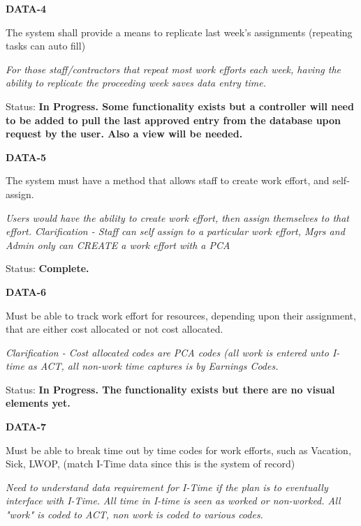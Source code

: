 \noindent 

\noindent \textbf{DATA-4}

\noindent The system shall provide a means to replicate last week's assignments (repeating tasks can auto fill)

\noindent \textit{For those staff/contractors that repeat most work efforts each week, having the ability to replicate the proceeding week saves data entry time.}

\noindent Status: \textbf{In Progress.  Some functionality exists but a controller will need to be added to pull the last approved entry from the database upon request by the user.  Also a view will be needed.}\textit{}\\

\noindent 

\noindent \textbf{DATA-5}

\noindent The system must have a method that allows staff to create work effort, and self-assign.

\noindent \textit{Users would have the ability to create work effort, then assign themselves to that effort. Clarification - Staff can self assign to a particular work effort, Mgrs and Admin only can CREATE a work effort with a PCA}

Status: \textbf{Complete.}\textit{}\\

\noindent 

\noindent \textbf{DATA-6}

\noindent Must be able to track work effort for resources, depending upon their assignment, that are either cost allocated or not cost allocated. 

\noindent \textit{Clarification - Cost allocated codes are PCA codes (all work is entered unto I-time as ACT, all non-work time captures is by Earnings Codes.}

Status: \textbf{In Progress.  The functionality exists but there are no visual elements yet.}\textit{}\\

\noindent 

\noindent \textbf{DATA-7}

\noindent Must be able to break time out by time codes for work efforts, such as Vacation, Sick, LWOP, (match I-Time data since this is the system of record)

\noindent \textit{Need to understand data requirement for I-Time if the plan is to eventually interface with I-Time.} \textit{All time in I-time is seen as worked or non-worked.  All "work" is coded to ACT, non work is coded to various codes.}

